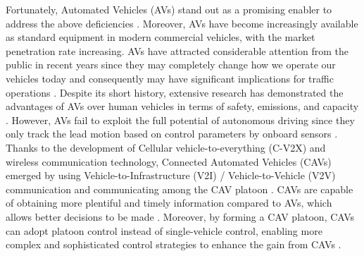 \documentclass[journal]{IEEEtran}
\begin{document}
Fortunately, Automated Vehicles (AVs) stand out as a promising enabler to address the above deficiencies \citep{Rudin-Brown2004,Nikolos2015a}. Moreover, AVs have become increasingly available as standard equipment in modern commercial vehicles, with the market penetration rate increasing. AVs have attracted considerable attention from the public in recent years since they may completely change how we operate our vehicles today and consequently may have significant implications for traffic operations \citep{Kesting2007,Delis2016}. Despite its short history, extensive research has demonstrated the advantages of AVs over human vehicles in terms of safety, emissions, and capacity \citep{Ngoduy2012,Ioannou2005,Kerner2021}.
However, AVs fail to exploit the full potential of autonomous driving since they only track the lead motion based on control parameters by onboard sensors \citep{Ruan2022,Brunner2022}. Thanks to the development of Cellular vehicle-to-everything (C-V2X) and wireless communication technology, Connected Automated Vehicles (CAVs) emerged by using Vehicle-to-Infrastructure (V2I) / Vehicle-to-Vehicle (V2V) communication and communicating among the CAV platoon \citep{Wang2022,Qin2021a}. CAVs are capable of obtaining more plentiful and timely information compared to AVs, which allows better decisions to be made \citep{Mu2021,Liu2021b}. Moreover, by forming a CAV platoon, CAVs can adopt platoon control instead of single-vehicle control, enabling more complex and sophisticated control strategies to enhance the gain from CAVs \citep{Kim2021,Yang2021,Zhou2021a}.
\end{document}
